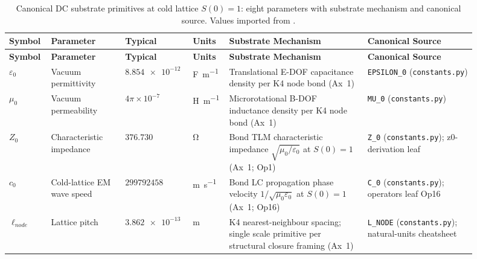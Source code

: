 \begin{footnotesize}
\setlength{\tabcolsep}{4pt}
\begin{longtable}{@{}p{0.07\linewidth} p{0.15\linewidth} p{0.13\linewidth} p{0.05\linewidth} p{0.28\linewidth} p{0.22\linewidth}@{}}
\caption{Canonical DC substrate primitives at cold lattice $S(0)=1$: eight parameters with substrate mechanism and canonical source. Values imported from .}\label{tab:vol9_dc_primitives}\\
\toprule
\textbf{Symbol} & \textbf{Parameter} & \textbf{Typical} & \textbf{Units} & \textbf{Substrate Mechanism} & \textbf{Canonical Source} \\
\midrule
\endfirsthead
\toprule
\textbf{Symbol} & \textbf{Parameter} & \textbf{Typical} & \textbf{Units} & \textbf{Substrate Mechanism} & \textbf{Canonical Source} \\
\midrule
\endhead
$\varepsilon_0$ & Vacuum permittivity & $\num{8.854e-12}$ & \si{\farad\per\metre} & Translational E-DOF capacitance density per K4 node bond (Ax~1) & \texttt{EPSILON\_0} \newline (\texttt{constants.py}) \\
$\mu_0$ & Vacuum permeability & $4\pi \times 10^{-7}$ & \si{\henry\per\metre} & Microrotational B-DOF inductance density per K4 node bond (Ax~1) & \texttt{MU\_0} \newline (\texttt{constants.py}) \\
$Z_0$ & Characteristic impedance & $\num{376.730}$ & \si{\ohm} & Bond TLM characteristic impedance $\sqrt{\mu_0/\varepsilon_0}$ at $S(0)=1$ (Ax~1; Op1) & \texttt{Z\_0} \newline (\texttt{constants.py}); \newline z0-derivation leaf \\
$c_0$ & Cold-lattice EM wave speed & $\num{299792458}$ & \si{\metre\per\second} & Bond LC propagation phase velocity $1/\sqrt{\mu_0\varepsilon_0}$ at $S(0)=1$ (Ax~1; Op16) & \texttt{C\_0} \newline (\texttt{constants.py}); \newline operators leaf Op16 \\
$\ell_{node}$ & Lattice pitch & $\num{3.862e-13}$ & \si{\metre} & K4 nearest-neighbour spacing; single scale primitive per structural closure framing (Ax~1) & \texttt{L\_NODE} \newline (\texttt{constants.py}); natural-units cheatsheet \\

\end{longtable}
\end{footnotesize}
